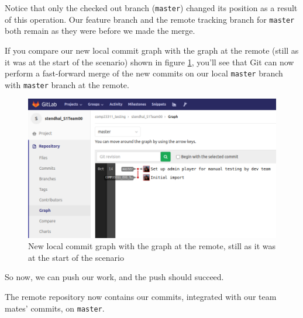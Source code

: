 \documentclass[
]{book}
\begin{document}
Notice that only the checked out branch (\texttt{master}) changed its position as a result of this operation. Our feature branch and the remote tracking branch for \texttt{master} both remain as they were before we made the merge.

If you compare our new local commit graph with the graph at the remote (still as it was at the start of the scenario) shown in figure \ref{fig:commitGraphInGitLabAfterPushNoHistoryGraphOnly2-fig}, you'll see that Git can now perform a fast-forward merge of the new commits on our local \texttt{master} branch with \texttt{master} branch at the remote.

\begin{figure}

{\centering \includegraphics[width=1\linewidth]{images/commitGraphInGitLabAfterPushNoHistoryGraphOnly} 

}

\caption{New local commit graph with the graph at the remote, still as it was at the start of the scenario}\label{fig:commitGraphInGitLabAfterPushNoHistoryGraphOnly2-fig}
\end{figure}

So now, we can push our work, and the push should succeed.

The remote repository now contains our commits, integrated with our team mates' commits, on \texttt{master}.
\end{document}
